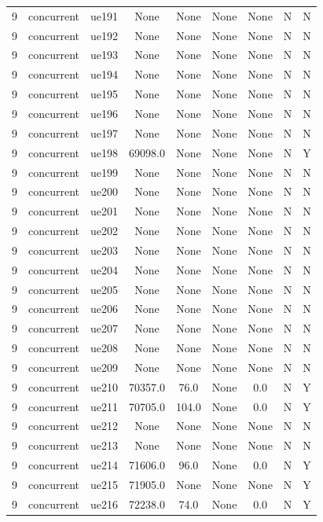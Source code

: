 \begin{table}[ht]
\begin{tabular}{|c|c|c|c|c|c|c|c|c|}
9 & concurrent & ue191 & None & None & None & None & N & N \\
9 & concurrent & ue192 & None & None & None & None & N & N \\
9 & concurrent & ue193 & None & None & None & None & N & N \\
9 & concurrent & ue194 & None & None & None & None & N & N \\
9 & concurrent & ue195 & None & None & None & None & N & N \\
9 & concurrent & ue196 & None & None & None & None & N & N \\
9 & concurrent & ue197 & None & None & None & None & N & N \\
9 & concurrent & ue198 & 69098.0 & None & None & None & N & Y \\
9 & concurrent & ue199 & None & None & None & None & N & N \\
9 & concurrent & ue200 & None & None & None & None & N & N \\
9 & concurrent & ue201 & None & None & None & None & N & N \\
9 & concurrent & ue202 & None & None & None & None & N & N \\
9 & concurrent & ue203 & None & None & None & None & N & N \\
9 & concurrent & ue204 & None & None & None & None & N & N \\
9 & concurrent & ue205 & None & None & None & None & N & N \\
9 & concurrent & ue206 & None & None & None & None & N & N \\
9 & concurrent & ue207 & None & None & None & None & N & N \\
9 & concurrent & ue208 & None & None & None & None & N & N \\
9 & concurrent & ue209 & None & None & None & None & N & N \\
9 & concurrent & ue210 & 70357.0 & 76.0 & None & 0.0 & N & Y \\
9 & concurrent & ue211 & 70705.0 & 104.0 & None & 0.0 & N & Y \\
9 & concurrent & ue212 & None & None & None & None & N & N \\
9 & concurrent & ue213 & None & None & None & None & N & N \\
9 & concurrent & ue214 & 71606.0 & 96.0 & None & 0.0 & N & Y \\
9 & concurrent & ue215 & 71905.0 & None & None & None & N & Y \\
9 & concurrent & ue216 & 72238.0 & 74.0 & None & 0.0 & N & Y \\

\end{tabular}
\end{table}
